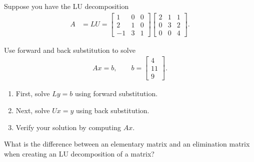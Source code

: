 \documentclass{ximera}
\begin{document}
\begin{exercise}
    Suppose you have the LU decomposition
    \begin{align*}
        A &= LU = 
        \begin{bmatrix}
            1 & 0 & 0\\
            2 & 1 & 0\\
            -1 & 3 & 1
        \end{bmatrix}
        \begin{bmatrix}
            2 & 1 & 1\\
            0 & 3 & 2\\
            0 & 0 & 4
        \end{bmatrix}.
    \end{align*}
    
    Use forward and back substitution to solve
    \begin{align*}
        Ax=b,
        \qquad
        b=
        \begin{bmatrix}
            4\\
            11\\
            9
        \end{bmatrix}.
    \end{align*}
    
    \begin{enumerate}
        \item First, solve $Ly=b$ using forward substitution.
        \item Next, solve $Ux=y$ using back substitution.
        \item Verify your solution by computing $Ax$.
    \end{enumerate}
\end{exercise}


\begin{exercise}
    What is the difference between an elementary matrix and an elimination matrix when creating an LU decomposition of a matrix?
\end{exercise}
\end{document}
